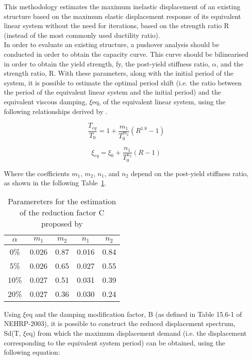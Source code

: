 This methodology estimates the maximum inelastic displacement of an existing structure based on the maximum elastic displacement response of its equivalent linear system without the need for iterations, based on the strength ratio R (instead of the most commonly used ductility ratio).\\
In order to evaluate an existing structure, a pushover analysis should be conducted in order to obtain the capacity curve. This curve should be bilinearised in order to obtain the yield strength, fy, the post-yield stiffness ratio, $\alpha$, and the strength ratio, R. With these parameters, along with the initial period of the system, it is possible to estimate the optimal period shift (i.e. the ratio between the period of the equivalent linear system and the initial period) and the equivalent viscous damping, $\xi$eq, of the equivalent linear system, using the following relationships derived by \citep{LinMiranda2008}.

\begin{equation}
 \frac{T_{eq}}{T_{0}} = 1 + \frac{m_1}{T_0^{m_2}}\left(R^{1.8}-1\right)
\end{equation}

\begin{equation}
 \xi_{eq} = \xi_{0} + \frac{n_1}{T_0^{n_2}}\left(R-1\right)
\end{equation}

Where the coefficients $m_1$, $m_2$, $n_1$, and $n_2$ depend on the post-yield stiffness ratio, as shown in the following Table~\ref{table:LinMiranda2008}.

\begin {table}[htb]
\caption{Paramereters for the estimation of the reduction factor C proposed by \citep{LinMiranda2008}}
\label{table:LinMiranda2008}
\begin{center}
  \begin{tabular}{ | c | c | c | c | c |}
    \hline
    $\alpha$ & $m_1$ & $m_2$ & $n_1$ & $n_2$ \\ \hline
    0\% & 0.026 & 0.87 & 0.016 & 0.84 \\ \hline
    5\% & 0.026 & 0.65 & 0.027 & 0.55 \\ \hline
    10\% & 0.027 & 0.51 & 0.031 & 0.39 \\ \hline
    20\% & 0.027 & 0.36 & 0.030 & 0.24 \\ \hline
  \end{tabular}
\end{center}
\end{table}
Using $\xi$eq and the damping modification factor, B (as defined in Table 15.6-1 of NEHRP-2003), it is possible to construct the reduced displacement spectrum, Sd(T, $\xi$eq) from which the maximum displacement demand (i.e. the displacement corresponding to the equivalent system period) can be obtained, using the following equation:

